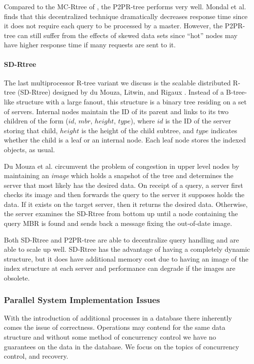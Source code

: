 Compared to the MC-Rtree of \cite{schnitzer1999master}, the P2PR-tree performs
very well. Mondal et al. finds that this decentralized technique 
dramatically decreases response time since it does not require each query to be 
processed by a master. However, the P2PR-tree can
still suffer from the effects of skewed data sets since ``hot'' nodes may have
higher response time if many requests are sent to it. 

\paragraph{SD-Rtree}
The last multiprocessor R-tree variant we discuss is the scalable distributed 
R-tree (SD-Rtree) designed by du Mouza, Litwin, and Rigaux \cite{du2007sd}. 
Instead of a B-tree-like structure with a large
fanout, this structure is a binary tree residing on a set of servers.
Internal nodes maintain the ID of its parent and links to its two children of 
the form ($id$, $mbr$, $height$, $type$), where $id$ is the ID of the server 
storing that child, $height$ is the height of the child subtree, and $type$ 
indicates whether the child is a leaf or an internal node. Each leaf node stores 
the indexed objects, as usual.

Du Mouza et al. \cite{du2007sd} circumvent the problem of congestion in 
upper level nodes by 
maintaining an \emph{image} which holds a snapshot of the tree and determines 
the server that most likely has the desired data. On receipt of a query, a 
server first checks its image and then forwards the query to the server it 
supposes holds the data. If it exists on the target server, then it returns the
desired data. Otherwise, the server examines the SD-Rtree from bottom up until a 
node containing the query MBR is found and sends back a message fixing the 
out-of-date image. %

Both SD-Rtree and P2PR-tree are able to decentralize query handling and are able
to scale up well. SD-Rtree has the advantage of having a completely dynamic 
structure, but it does have additional memory cost due to having an image of the 
index structure at each server and performance can degrade if the images are 
obsolete.

\subsubsection{Parallel System Implementation Issues}
With the introduction of additional processes in a database there inherently
comes the issue of correctness. Operations may contend for the same data 
structure and without some method of concurrency control we have no guarantees
on the data in the database. We focus on the topics of concurrency control, 
and recovery.

